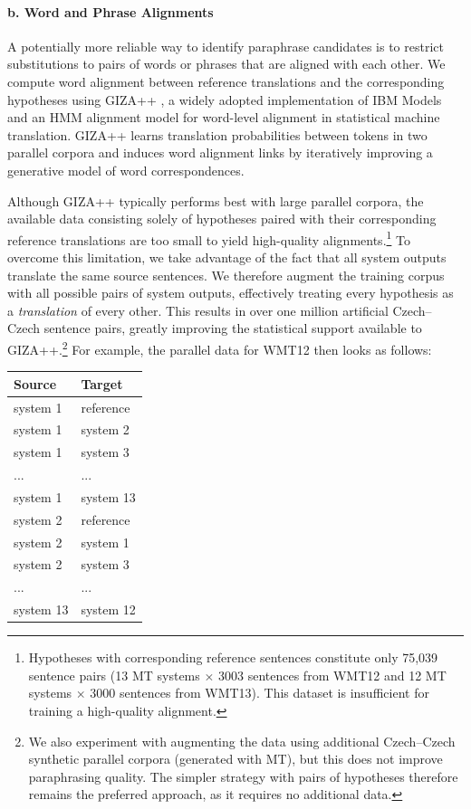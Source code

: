 \paragraph{b. Word and Phrase Alignments}
\label{alignments}
\hfill \break
A potentially more reliable way to identify paraphrase candidates is to restrict substitutions to pairs of words or phrases that are aligned with each other. We compute word alignment between reference translations and the corresponding hypotheses using GIZA++ \citep{gizapp}, a widely adopted implementation of IBM Models and an HMM alignment model for word-level alignment in statistical machine translation. GIZA++ learns translation probabilities between tokens in two parallel corpora and induces word alignment links by iteratively improving a generative model of word correspondences.

Although GIZA++ typically performs best with large parallel corpora, the available data consisting solely of hypotheses paired with their corresponding reference translations are too small to yield high-quality alignments.\footnote{Hypotheses with corresponding reference sentences constitute only 75,039 sentence pairs (13 MT systems $\times$ 3003 sentences from WMT12 and 12 MT systems $\times$ 3000 sentences from WMT13). This dataset is insufficient for training a high-quality alignment.} To overcome this limitation, we take advantage of the fact that all system outputs translate the same source sentences. We therefore augment the training corpus with all possible pairs of system outputs, effectively treating every hypothesis as a \textit{translation} of every other. This results in over one million artificial Czech–Czech sentence pairs, greatly improving the statistical support available to GIZA++.\footnote{We also experiment with augmenting the data using additional Czech–Czech synthetic parallel corpora (generated with MT),  %
but this does not improve paraphrasing quality. The simpler strategy with pairs of hypotheses therefore remains the preferred approach, as it requires no additional data.} For example, the parallel data for WMT12 then looks as follows:

\begin{center}
\begin{tabular}{ll}
Source & Target \\
\hline
system 1 & reference \\
system 1 & system 2 \\
system 1 & system 3 \\
... & ...\\
system 1 & system 13 \\
system 2 & reference \\
system 2 & system 1 \\
system 2 & system 3 \\
... & ... \\
system 13 & system 12 \\
\end{tabular}
\end{center}


